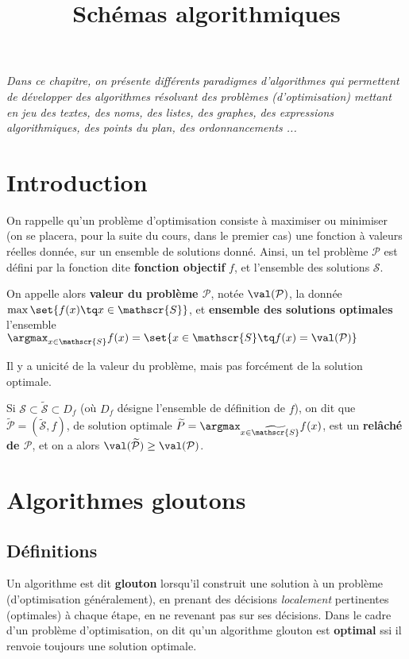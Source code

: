 \documentclass{scrartcl}
\title{Schémas algorithmiques}
\author{}
\date{}
\begin{document}
	\maketitle
	\begin{center}
		\textsl{Dans ce chapitre, on présente différents paradigmes d'algorithmes qui permettent de développer des algorithmes résolvant des problèmes (d'optimisation)
		mettant en jeu des textes, des noms, des listes, des graphes, des expressions algorithmiques, des points du plan, des ordonnancements ...}
	\end{center}

	\section{Introduction}
		On rappelle qu'un problème d'optimisation consiste à maximiser ou minimiser (on se placera, pour la suite du cours, dans le premier cas) une fonction à valeurs réelles donnée, 
		sur un ensemble de solutions donné. 
		Ainsi, un tel problème $\mathcal{P}$ est défini par la fonction dite \textbf{fonction objectif} $f$, 
		et l'ensemble des solutions $\mathscr{S}$.
		
		On appelle alors \textbf{valeur du problème $\mathcal{P}$}, notée $\val(\mathcal{P})$, la donnée $\max \set{f(x) \tq x \in \mathscr{S}}$,
		et \textbf{ensemble des solutions optimales} l'ensemble $\argmax_{x\in\mathscr{S}} f(x) = \set{x \in \mathscr{S} \tq f(x) = \val(\mathcal{P})}$
	
		\rem Il y a unicité de la valeur du problème, mais pas forcément de la solution optimale.

		Si $\mathscr{S} \subset \widetilde{\mathscr{S}} \subset D_f$ (où $D_f$ désigne l'ensemble de définition de $f$), 
		on dit que $\widetilde{\mathcal{P}} = (\widetilde{\mathscr{S}},f)$, 
		de solution optimale $\widetilde{P} = \argmax_{x \in \widetilde{\mathscr{S}}} f(x)$, 
		est un \textbf{relâché de $\mathcal{P}$}, et on a alors $\val(\widetilde{\mathcal{P}}) \geq \val(\mathcal{P})$. 
		
		\warnwipnext

	\section{Algorithmes gloutons}
		\subsection{Définitions}
			Un algorithme est dit \textbf{glouton} lorsqu'il construit une solution à un problème (d'optimisation généralement), 
			en prenant des décisions \textsl{localement} pertinentes (optimales) à chaque étape, en ne revenant pas sur ses décisions.
			Dans le cadre d'un problème d'optimisation, on dit qu'un algorithme glouton est \textbf{optimal} ssi il renvoie toujours une solution optimale.
			
\end{document}
